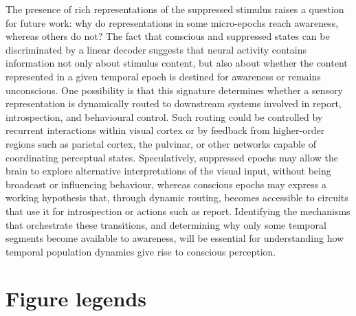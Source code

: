 \documentclass{article}
\begin{document}
The presence of rich representations of the suppressed stimulus raises a question for future work: why do representations in some micro-epochs reach awareness, whereas others do not? The fact that conscious and suppressed states can be discriminated by a linear decoder suggests that neural activity contains information not only about stimulus content, but also about whether the content represented in a given temporal epoch is destined for awareness or remains unconscious. One possibility is that this signature determines whether a sensory representation is dynamically routed to downstream systems involved in report, introspection, and behavioural control. Such routing could be controlled by recurrent interactions within visual cortex or by feedback from higher-order regions such as parietal cortex, the pulvinar, or other networks capable of coordinating perceptual states. Speculatively, suppressed epochs may allow the brain to explore alternative interpretations of the visual input, without being broadcast or influencing behaviour, whereas conscious epochs may express a working hypothesis that, through dynamic routing, becomes accessible to circuits that use it for introspection or actions such as report. Identifying the mechanisms that orchestrate these transitions, and determining why only some temporal segments become available to awareness, will be essential for understanding how temporal population dynamics give rise to conscious perception.




\section*{Figure legends}
\end{document}
